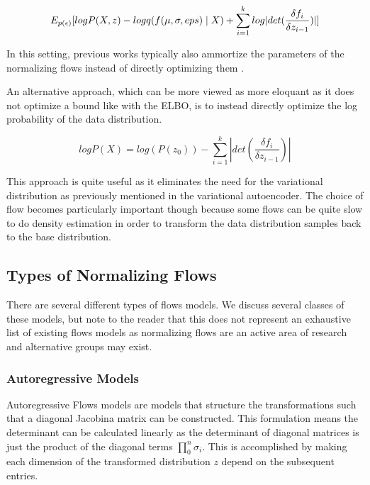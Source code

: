 \begin{equation}
E_{p(\epsilon)} [ log P(X, z) - log q( f(\mu, \sigma, eps) \; | \;{X}) + \sum_{i=1}^{k}log |det (\frac{\delta f_{i}}{\delta z_{i-1}}) | ]
\end{equation}

In this setting, previous works typically also ammortize the parameters of the normalizing flows instead of directly optimizing them  \cite{rezende2015VIwithNF,tomczak2016Householder,vdberg2018sylvester}. 

An alternative approach, which can be more viewed as more eloquant as it does not optimize a bound like with the \ac{ELBO}, is to instead directly optimize the log probability of the data distribution.
 
\begin{equation}
	logP(X) = log(P(z_{0})) - \sum_{i=1}^{k} |det (\frac{\delta f_{i}}{\delta z_{i-1}}) |
\end{equation}

This approach is quite useful as it eliminates the need for the variational distribution as previously mentioned in the variational autoencoder. The choice of flow becomes particularly important though because some flows can be quite slow to do density estimation in order to transform the data distribution samples back to the base distribution. 




\subsection{Types of Normalizing Flows}

There are several different types of flows models. We discuss several classes of these models, but note to the reader that this does not represent an exhaustive list of existing flows models as normalizing flows are an active area of research and alternative groups may exist. 

\subsubsection{Autoregressive Models}
Autoregressive Flows models are models that structure the transformations such that a diagonal Jacobina matrix can be constructed. This formulation means the determinant can be calculated linearly as the determinant of diagonal matrices is just the product of the diagonal terms $\prod_{0}^{n} \sigma_{i}$. This is accomplished by making each dimension of the transformed distribution $z$ depend on the subsequent entries.



